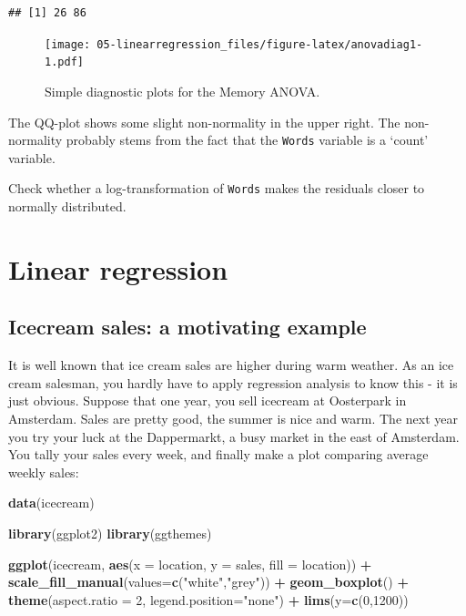 \documentclass[]{book}
\newenvironment{Shaded}{\begin{snugshade}}{\end{snugshade}}
\newcommand{\DataTypeTok}[1]{\textcolor[rgb]{0.13,0.29,0.53}{#1}}
\newcommand{\DecValTok}[1]{\textcolor[rgb]{0.00,0.00,0.81}{#1}}
\newcommand{\KeywordTok}[1]{\textcolor[rgb]{0.13,0.29,0.53}{\textbf{#1}}}
\newcommand{\NormalTok}[1]{#1}
\newcommand{\OperatorTok}[1]{\textcolor[rgb]{0.81,0.36,0.00}{\textbf{#1}}}
\newcommand{\StringTok}[1]{\textcolor[rgb]{0.31,0.60,0.02}{#1}}
\let\BeginKnitrBlock\begin \let\EndKnitrBlock\end
\begin{document}
\begin{verbatim}
## [1] 26 86
\end{verbatim}

\begin{figure}
\centering
\texttt{[image: 05-linearregression\_files/figure-latex/anovadiag1-1.pdf]}
\caption{\label{fig:anovadiag1}Simple diagnostic plots for the Memory ANOVA.}
\end{figure}

The QQ-plot shows some slight non-normality in the upper right. The non-normality probably stems from the fact that the \texttt{Words} variable is a `count' variable.

\BeginKnitrBlock{rmdtry}
Check whether a log-transformation of \texttt{Words} makes the residuals closer to normally distributed.
\EndKnitrBlock{rmdtry}

\hypertarget{linear-regression}{%
\section{Linear regression}\label{linear-regression}}

\hypertarget{icecream}{%
\subsection{Icecream sales: a motivating example}\label{icecream}}

It is well known that ice cream sales are higher during warm weather. As an ice cream salesman, you hardly have to apply regression analysis to know this - it is just obvious. Suppose that one year, you sell icecream at Oosterpark in Amsterdam. Sales are pretty good, the summer is nice and warm. The next year you try your luck at the Dappermarkt, a busy market in the east of Amsterdam. You tally your sales every week, and finally make a plot comparing average weekly sales:

\begin{Shaded}
\begin{Highlighting}[]
\KeywordTok{data}\NormalTok{(icecream)}

\KeywordTok{library}\NormalTok{(ggplot2)}
\KeywordTok{library}\NormalTok{(ggthemes)}

\KeywordTok{ggplot}\NormalTok{(icecream, }\KeywordTok{aes}\NormalTok{(}\DataTypeTok{x =}\NormalTok{ location, }\DataTypeTok{y =}\NormalTok{ sales, }\DataTypeTok{fill =}\NormalTok{ location)) }\OperatorTok{+}\StringTok{ }
\StringTok{  }\KeywordTok{scale_fill_manual}\NormalTok{(}\DataTypeTok{values=}\KeywordTok{c}\NormalTok{(}\StringTok{"white"}\NormalTok{,}\StringTok{"grey"}\NormalTok{)) }\OperatorTok{+}\StringTok{ }
\StringTok{  }\KeywordTok{geom_boxplot}\NormalTok{() }\OperatorTok{+}
\StringTok{  }\KeywordTok{theme}\NormalTok{(}\DataTypeTok{aspect.ratio =} \DecValTok{2}\NormalTok{, }\DataTypeTok{legend.position=}\StringTok{"none"}\NormalTok{) }\OperatorTok{+}
\StringTok{  }\KeywordTok{lims}\NormalTok{(}\DataTypeTok{y=}\KeywordTok{c}\NormalTok{(}\DecValTok{0}\NormalTok{,}\DecValTok{1200}\NormalTok{))}
\end{Highlighting}
\end{Shaded}
\end{document}
